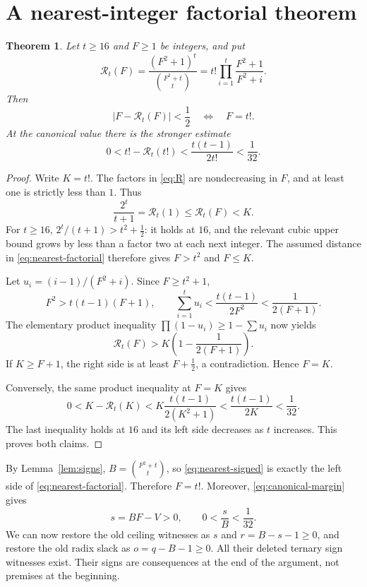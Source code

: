 \documentclass[11pt,letterpaper]{article}
\newtheorem{theorem}{Theorem}[section]
\theoremstyle{remark}\newtheorem{remark}[theorem]{Remark}
\begin{document}
\section{A nearest-integer factorial theorem}
\label{sec:factorial}
\begin{theorem}\label{thm:nearest}
Let $t\ge16$ and $F\ge1$ be integers, and put
\begin{equation}\label{eq:R}
 \mathcal R_t(F)=\frac{(F^2+1)^t}{\binom{F^2+t}{t}}
   =t!\prod_{i=1}^{t}\frac{F^2+1}{F^2+i}.
\end{equation}
Then
\begin{equation}\label{eq:nearest-factorial}
 \left|F-\mathcal R_t(F)\right|<\frac12
 \quad\Longleftrightarrow\quad F=t!.
\end{equation}
At the canonical value there is the stronger estimate
\begin{equation}\label{eq:canonical-margin}
 0<t!-\mathcal R_t(t!)<\frac{t(t-1)}{2t!}<\frac1{32}.
\end{equation}
\end{theorem}
\begin{proof}
Write $K=t!$. The factors in \eqref{eq:R} are nondecreasing in $F$, and at least one is strictly less than $1$. Thus
\[
 \frac{2^t}{t+1}=\mathcal R_t(1)\le\mathcal R_t(F)<K.
\]
For $t\ge16$, $2^t/(t+1)>t^2+\tfrac12$: it holds at $16$, and the relevant cubic upper bound grows by less than a factor two at each next integer. The assumed distance in \eqref{eq:nearest-factorial} therefore gives $F>t^2$ and $F\le K$.

Let $u_i=(i-1)/(F^2+i)$. Since $F\ge t^2+1$,
\[
 F^2>t(t-1)(F+1),\qquad
 \sum_{i=1}^{t}u_i<\frac{t(t-1)}{2F^2}<\frac1{2(F+1)}.
\]
The elementary product inequality $\prod(1-u_i)\ge1-\sum u_i$ now yields
\[
 \mathcal R_t(F)>K\left(1-\frac1{2(F+1)}\right).
\]
If $K\ge F+1$, the right side is at least $F+\tfrac12$, a contradiction. Hence $F=K$.

Conversely, the same product inequality at $F=K$ gives
\[
 0<K-\mathcal R_t(K)
 <K\frac{t(t-1)}{2(K^2+1)}
 <\frac{t(t-1)}{2K}<\frac1{32}.
\]
The last inequality holds at $16$ and its left side decreases as $t$ increases. This proves both claims.
\end{proof}

By Lemma~\ref{lem:signs}, $B=\binom{F^2+t}{t}$, so \eqref{eq:nearest-signed} is exactly the left side of \eqref{eq:nearest-factorial}. Therefore $F=t!$. Moreover, \eqref{eq:canonical-margin} gives
\begin{equation}\label{eq:restored-s}
 s=BF-V>0,\qquad 0<\frac sB<\frac1{32}.
\end{equation}
We can now restore the old ceiling witnesses as $s$ and $r=B-s-1\ge0$, and restore the old radix slack as $o=q-B-1\ge0$. All their deleted ternary sign witnesses exist. Their signs are consequences at the end of the argument, not premises at the beginning.
\end{document}
